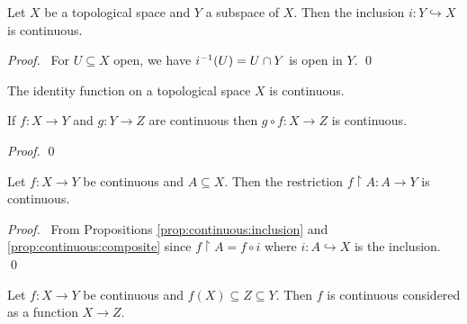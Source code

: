 \begin{prop}
  \label{prop:continuous:inclusion}
  Let $X$ be a topological space and $Y$ a subspace of $X$. Then the inclusion $i : Y \hookrightarrow X$ is continuous.
\end{prop}

\begin{proof}
  \pf\ For $U \subseteq X$ open, we have ${i}^{-1}(U) = U \cap Y$ is open in $Y$. \qed
\end{proof}

\begin{cor}
  \label{cor:continuous:identity}
  The identity function on a topological space $X$ is continuous.
\end{cor}

\begin{prop}
  \label{prop:continuous:composite}
  If $f : X \rightarrow Y$ and $g : Y \rightarrow Z$ are continuous then $g \circ f : X \rightarrow Z$ is continuous.
\end{prop}

\begin{proof}
  \pf
  \qed
\end{proof}

\begin{prop}
  Let $f : X \rightarrow Y$ be continuous and $A \subseteq X$. Then the restriction $f \restriction A : A \rightarrow Y$ is continuous.
\end{prop}

\begin{proof}
  \pf\ From Propositions \ref{prop:continuous:inclusion} and \ref{prop:continuous:composite} since $f \restriction A = f \circ i$ where $i : A \hookrightarrow X$ is the inclusion. \qed
\end{proof}

\begin{prop}
  \label{prop:continuous:restrict_domain}
  Let $f : X \rightarrow Y$ be continuous and $f(X) \subseteq Z \subseteq Y$. Then $f$ is continuous considered as a function $X \rightarrow Z$.
\end{prop}

